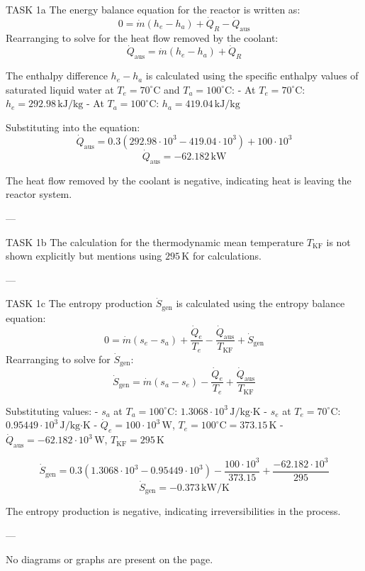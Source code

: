 TASK 1a  
The energy balance equation for the reactor is written as:  
\[
0 = \dot{m}(h_e - h_a) + \dot{Q}_R - \dot{Q}_{\text{aus}}
\]  
Rearranging to solve for the heat flow removed by the coolant:  
\[
\dot{Q}_{\text{aus}} = \dot{m}(h_e - h_a) + \dot{Q}_R
\]  

The enthalpy difference \( h_e - h_a \) is calculated using the specific enthalpy values of saturated liquid water at \( T_e = 70^\circ\text{C} \) and \( T_a = 100^\circ\text{C} \):  
- At \( T_e = 70^\circ\text{C} \): \( h_e = 292.98 \, \text{kJ/kg} \)  
- At \( T_a = 100^\circ\text{C} \): \( h_a = 419.04 \, \text{kJ/kg} \)  

Substituting into the equation:  
\[
\dot{Q}_{\text{aus}} = 0.3 \left(292.98 \cdot 10^3 - 419.04 \cdot 10^3\right) + 100 \cdot 10^3
\]  
\[
\dot{Q}_{\text{aus}} = -62.182 \, \text{kW}
\]  

The heat flow removed by the coolant is negative, indicating heat is leaving the reactor system.  

---

TASK 1b  
The calculation for the thermodynamic mean temperature \( T_{\text{KF}} \) is not shown explicitly but mentions using \( 295 \, \text{K} \) for calculations.  

---

TASK 1c  
The entropy production \( \dot{S}_{\text{gen}} \) is calculated using the entropy balance equation:  
\[
0 = \dot{m}(s_e - s_a) + \frac{\dot{Q}_e}{T_e} - \frac{\dot{Q}_{\text{aus}}}{T_{\text{KF}}} + \dot{S}_{\text{gen}}
\]  
Rearranging to solve for \( \dot{S}_{\text{gen}} \):  
\[
\dot{S}_{\text{gen}} = \dot{m}(s_a - s_e) - \frac{\dot{Q}_e}{T_e} + \frac{\dot{Q}_{\text{aus}}}{T_{\text{KF}}}
\]  

Substituting values:  
- \( s_a \) at \( T_a = 100^\circ\text{C} \): \( 1.3068 \cdot 10^3 \, \text{J/kg·K} \)  
- \( s_e \) at \( T_e = 70^\circ\text{C} \): \( 0.95449 \cdot 10^3 \, \text{J/kg·K} \)  
- \( \dot{Q}_e = 100 \cdot 10^3 \, \text{W} \), \( T_e = 100^\circ\text{C} = 373.15 \, \text{K} \)  
- \( \dot{Q}_{\text{aus}} = -62.182 \cdot 10^3 \, \text{W} \), \( T_{\text{KF}} = 295 \, \text{K} \)  

\[
\dot{S}_{\text{gen}} = 0.3(1.3068 \cdot 10^3 - 0.95449 \cdot 10^3) - \frac{100 \cdot 10^3}{373.15} + \frac{-62.182 \cdot 10^3}{295}
\]  
\[
\dot{S}_{\text{gen}} = -0.373 \, \text{kW/K}
\]  

The entropy production is negative, indicating irreversibilities in the process.  

---

No diagrams or graphs are present on the page.